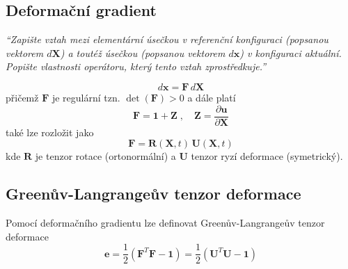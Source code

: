 \documentclass{article}
\begin{document}
\begin{multicols}{2}
	\section{Deformační gradient}
	\emph{``Zapište vztah mezi elementární úsečkou v referenční konfiguraci (popsanou vektorem $d\bm{X}$) a toutéž úsečkou (popsanou vektorem $d\bm{x}$) v konfiguraci aktuální. Popište vlastnosti operátoru, který tento vztah zprostředkuje.''}

	\begin{equation*}
		d\bm{x} = \bm{F} \, d\bm{X}
	\end{equation*}
	přičemž $\bm{F}$ je regulární tzn. $\det(\bm{F}) > 0$ a dále platí
	\begin{equation*}
	\bm{F} = \bm{1} + \bm{Z}
	\;,\quad 
	\bm{Z} = \frac{\partial \bm{u}}{\partial \bm{X}}
	\end{equation*}
	také lze rozložit jako
	\begin{equation*}
	\bm{F} = \bm{R}(\bm{X},t)\,\bm{U}(\bm{X},t)
	\end{equation*}
	kde $\bm{R}$ je tenzor rotace (ortonormální) a $\bm{U}$ tenzor ryzí deformace (symetrický).
	
	\subsection{Greenův-Langrangeův tenzor deformace}
	Pomocí deformačního gradientu lze definovat Greenův-Langrangeův tenzor deformace
	\begin{equation*}
	\bm{e} = \frac{1}{2}(\bm{F}^T\bm{F} - \bm{1}) = \frac{1}{2}(\bm{U}^T\bm{U} - \bm{1})
	\end{equation*}


\end{multicols}
\end{document}
